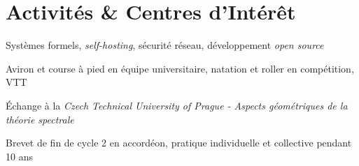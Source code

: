 \section{Activités \& Centres d'Intérêt}

\begin{entryblock}
     Systèmes formels, \textit{self-hosting}, sécurité réseau, développement \textit{open source}
\end{entryblock}

\begin{entryblock}
     Aviron et course à pied en équipe universitaire, natation et roller en compétition, VTT
\end{entryblock}

\begin{entryblock}
    Échange à la \textit{Czech Technical University of Prague - Aspects géométriques de la théorie spectrale}
\end{entryblock}

\begin{entryblock}
     Brevet de fin de cycle 2 en accordéon, pratique individuelle et collective pendant 10 ans
\end{entryblock}
